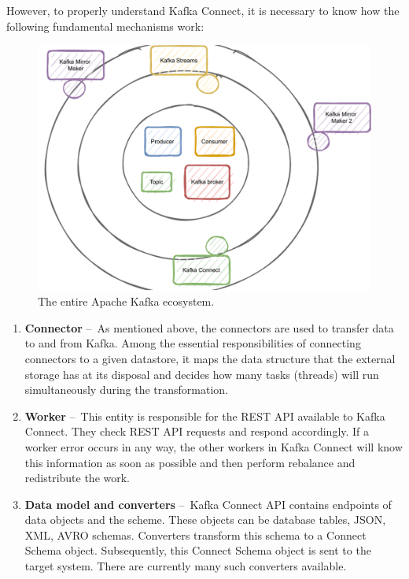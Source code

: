 However, to properly understand Kafka Connect, it is necessary to know how the following fundamental mechanisms work:

\begin{figure}[!ht]
    \centering
    \includegraphics[scale=0.8]{obrazky-figures/02-preliminaries/02-kafka/12-all-in-one}
    \caption{The entire Apache Kafka ecosystem.}
    \label{fig:02-ecosystem-of-kafka}
\end{figure}

\begin{enumerate}
    \item \textbf{Connector} \---\ As mentioned above, the connectors are used to transfer data to and from Kafka.
    Among the essential responsibilities of connecting connectors to a given datastore, it maps the data structure that the external storage has at its disposal and decides how many tasks (threads) will run simultaneously during the transformation.
    \item \textbf{Worker} \---\ This entity is responsible for the REST API available to Kafka Connect.
    They check REST API requests and respond accordingly.
    If a worker error occurs in any way, the other workers in Kafka Connect will know this information as soon as possible and then perform rebalance and redistribute the work.
    \item \textbf{Data model and converters} \---\ Kafka Connect API contains endpoints of data objects and the scheme.
    These objects can be database tables, JSON, XML, AVRO schemas.
    Converters transform this schema to a Connect Schema object.
    Subsequently, this Connect Schema object is sent to the target system.
    There are currently many such converters available.
\end{enumerate}

